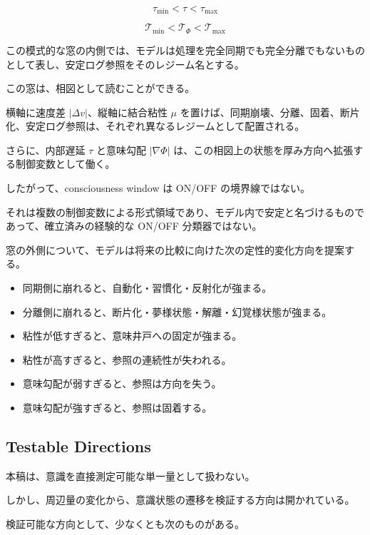 \begin{equation}
\tau_{\min} < \tau < \tau_{\max}
\end{equation}

\begin{equation}
\mathcal{T}_{\min}
<
\mathcal{T}_{\Phi}
<
\mathcal{T}_{\max}
\end{equation}

この模式的な窓の内側では、モデルは処理を完全同期でも完全分離でもないものとして表し、安定ログ参照をそのレジーム名とする。

この窓は、相図として読むことができる。

横軸に速度差 $|\Delta v|$、縦軸に結合粘性 $\mu$ を置けば、同期崩壊、分離、固着、断片化、安定ログ参照は、それぞれ異なるレジームとして配置される。

さらに、内部遅延 $\tau$ と意味勾配 $|\nabla \Phi|$ は、この相図上の状態を厚み方向へ拡張する制御変数として働く。

したがって、consciousness window は ON/OFF の境界線ではない。

それは複数の制御変数による形式領域であり、モデル内で安定と名づけるものであって、確立済みの経験的な ON/OFF 分類器ではない。

窓の外側について、モデルは将来の比較に向けた次の定性的変化方向を提案する。

\begin{itemize}
\item 同期側に崩れると、自動化・習慣化・反射化が強まる。
\item 分離側に崩れると、断片化・夢様状態・解離・幻覚様状態が強まる。
\item 粘性が低すぎると、意味井戸への固定が強まる。
\item 粘性が高すぎると、参照の連続性が失われる。
\item 意味勾配が弱すぎると、参照は方向を失う。
\item 意味勾配が強すぎると、参照は固着する。
\end{itemize}

\subsection{Testable Directions}

本稿は、意識を直接測定可能な単一量として扱わない。

しかし、周辺量の変化から、意識状態の遷移を検証する方向は開かれている。

検証可能な方向として、少なくとも次のものがある。

